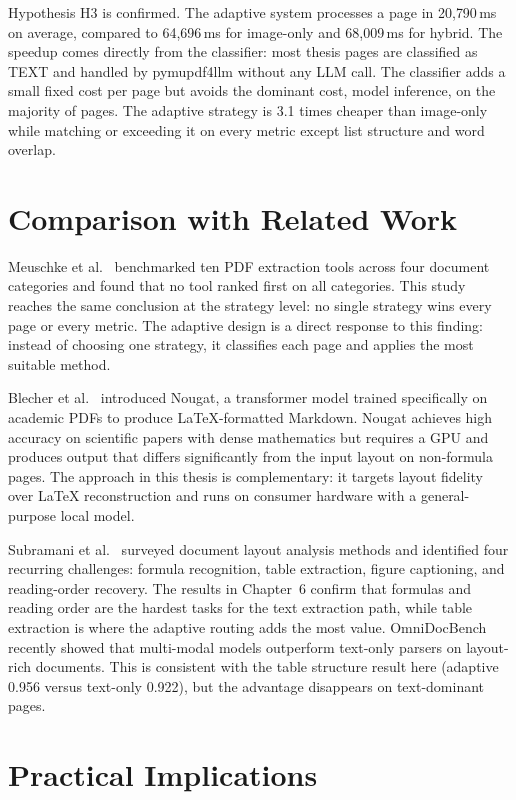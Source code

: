 Hypothesis H3 is confirmed. The adaptive system processes a page in
20{,}790\,ms on average, compared to 64{,}696\,ms for image-only and
68{,}009\,ms for hybrid. The speedup comes directly from the
classifier: most thesis pages are classified as TEXT and handled by
pymupdf4llm without any LLM call. The classifier adds a small fixed
cost per page but avoids the dominant cost, model inference, on the
majority of pages. The adaptive strategy is 3.1 times cheaper than
image-only while matching or exceeding it on every metric except list
structure and word overlap.

\section{Comparison with Related Work}

Meuschke et al.\ \autocite{meuschke2023} benchmarked ten PDF extraction
tools across four document categories and found that no tool ranked
first on all categories. This study reaches the same conclusion at the
strategy level: no single strategy wins every page or every metric. The
adaptive design is a direct response to this finding: instead of
choosing one strategy, it classifies each page and applies the most
suitable method.

Blecher et al.\ \autocite{blecher2023} introduced Nougat, a transformer
model trained specifically on academic PDFs to produce LaTeX-formatted
Markdown. Nougat achieves high accuracy on scientific papers with dense
mathematics but requires a GPU and produces output that differs
significantly from the input layout on non-formula pages. The approach
in this thesis is complementary: it targets layout fidelity over LaTeX
reconstruction and runs on consumer hardware with a general-purpose
local model.

Subramani et al.\ \autocite{subramani2020} surveyed document layout
analysis methods and identified four recurring challenges: formula
recognition, table extraction, figure captioning, and reading-order
recovery. The results in Chapter~6 confirm that formulas and reading
order are the hardest tasks for the text extraction path, while table
extraction is where the adaptive routing adds the most value.
OmniDocBench \autocite{omnidocbench2025} recently showed that multi-modal
models outperform text-only parsers on layout-rich documents. This is
consistent with the table structure result here (adaptive 0.956 versus
text-only 0.922), but the advantage disappears on text-dominant pages.

\section{Practical Implications}


